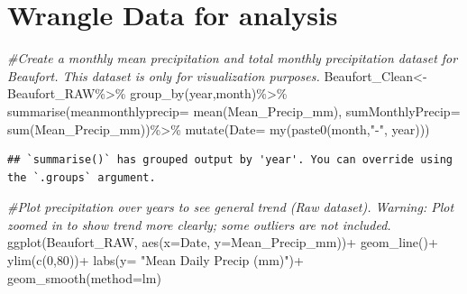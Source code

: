 \documentclass[
  12pt,
]{article}
\newenvironment{Shaded}{\begin{snugshade}}{\end{snugshade}}
\newcommand{\AttributeTok}[1]{\textcolor[rgb]{0.77,0.63,0.00}{#1}}
\newcommand{\CommentTok}[1]{\textcolor[rgb]{0.56,0.35,0.01}{\textit{#1}}}
\newcommand{\DecValTok}[1]{\textcolor[rgb]{0.00,0.00,0.81}{#1}}
\newcommand{\FunctionTok}[1]{\textcolor[rgb]{0.00,0.00,0.00}{#1}}
\newcommand{\NormalTok}[1]{#1}
\newcommand{\OtherTok}[1]{\textcolor[rgb]{0.56,0.35,0.01}{#1}}
\newcommand{\SpecialCharTok}[1]{\textcolor[rgb]{0.00,0.00,0.00}{#1}}
\newcommand{\StringTok}[1]{\textcolor[rgb]{0.31,0.60,0.02}{#1}}
\begin{document}
\hypertarget{wrangle-data-for-analysis}{%
\section{Wrangle Data for analysis}\label{wrangle-data-for-analysis}}

\begin{Shaded}
\begin{Highlighting}[]
\CommentTok{\#Create a monthly mean precipitation and total monthly precipitation dataset for Beaufort. This dataset is only for visualization purposes. }
\NormalTok{Beaufort\_Clean}\OtherTok{\textless{}{-}}\NormalTok{ Beaufort\_RAW}\SpecialCharTok{\%\textgreater{}\%}
  \FunctionTok{group\_by}\NormalTok{(year,month)}\SpecialCharTok{\%\textgreater{}\%}
   \FunctionTok{summarise}\NormalTok{(}\AttributeTok{meanmonthlyprecip=} \FunctionTok{mean}\NormalTok{(Mean\_Precip\_mm),}
             \AttributeTok{sumMonthlyPrecip=} \FunctionTok{sum}\NormalTok{(Mean\_Precip\_mm))}\SpecialCharTok{\%\textgreater{}\%}
  \FunctionTok{mutate}\NormalTok{(}\AttributeTok{Date=} \FunctionTok{my}\NormalTok{(}\FunctionTok{paste0}\NormalTok{(month,}\StringTok{"{-}"}\NormalTok{, year)))}
\end{Highlighting}
\end{Shaded}

\begin{verbatim}
## `summarise()` has grouped output by 'year'. You can override using the `.groups` argument.
\end{verbatim}

\begin{Shaded}
\begin{Highlighting}[]
\CommentTok{\#Plot precipitation over years to see general trend (Raw dataset). Warning: Plot zoomed in to show trend more clearly; some outliers are not included.}
\FunctionTok{ggplot}\NormalTok{(Beaufort\_RAW, }\FunctionTok{aes}\NormalTok{(}\AttributeTok{x=}\NormalTok{Date, }\AttributeTok{y=}\NormalTok{Mean\_Precip\_mm))}\SpecialCharTok{+}
  \FunctionTok{geom\_line}\NormalTok{()}\SpecialCharTok{+}
  \FunctionTok{ylim}\NormalTok{(}\FunctionTok{c}\NormalTok{(}\DecValTok{0}\NormalTok{,}\DecValTok{80}\NormalTok{))}\SpecialCharTok{+}
  \FunctionTok{labs}\NormalTok{(}\AttributeTok{y=} \StringTok{"Mean Daily Precip (mm)"}\NormalTok{)}\SpecialCharTok{+}
  \FunctionTok{geom\_smooth}\NormalTok{(}\AttributeTok{method=}\NormalTok{lm)}
\end{Highlighting}
\end{Shaded}
\end{document}
